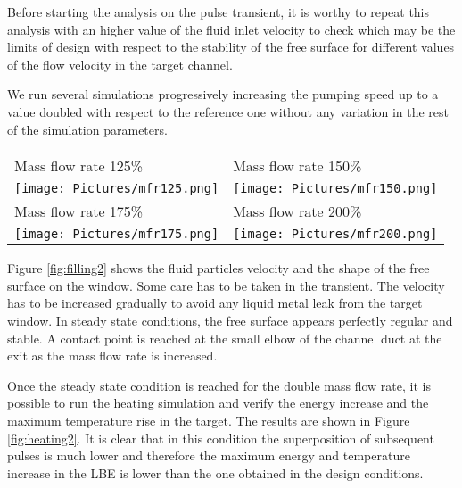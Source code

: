 \documentclass[a4paper, 11pt, twocolumn]{article}
\begin{document}
Before starting the analysis on the pulse transient, it is worthy to repeat this analysis with an higher value of the fluid inlet velocity to check which may be the limits of design with respect to the stability of the free surface for different values of the flow velocity in the target channel.

We run several simulations progressively increasing the pumping speed up to a value doubled with respect to the reference one without any variation in the rest of the simulation parameters.

\begin{figure*}[t]
\centering
\begin{tabular}{|l|l|}
\hline
\small Mass flow rate 125\% & \small Mass flow rate 150\% \\
\texttt{[image: Pictures/mfr125.png]} &
\texttt{[image: Pictures/mfr150.png]} \\
\hline
\small Mass flow rate 175\% & \small Mass flow rate 200\% \\
\texttt{[image: Pictures/mfr175.png]} &
\texttt{[image: Pictures/mfr200.png]} \\
\hline
\end{tabular}
\caption{Particle velocity in the target with increasing the mass flow rate}
\label{fig:filling2}
\end{figure*}

Figure \ref{fig:filling2} shows the fluid particles velocity and the shape of the free surface on the window. Some care has to be taken in the transient. The velocity has to be increased gradually to avoid any liquid metal leak from the target window. In steady state conditions, the free surface appears perfectly regular and stable. A contact point is reached at the small elbow of the channel duct at the exit as the mass flow rate is increased.

Once the steady state condition is reached for the double mass flow rate, it is possible to run the heating simulation and verify the energy increase and the maximum temperature rise in the target. The results are shown in Figure \ref{fig:heating2}. It is clear that in this condition the superposition of subsequent pulses is much lower and therefore the maximum energy and temperature increase in the LBE is lower than the one obtained in the design conditions.
\end{document}
